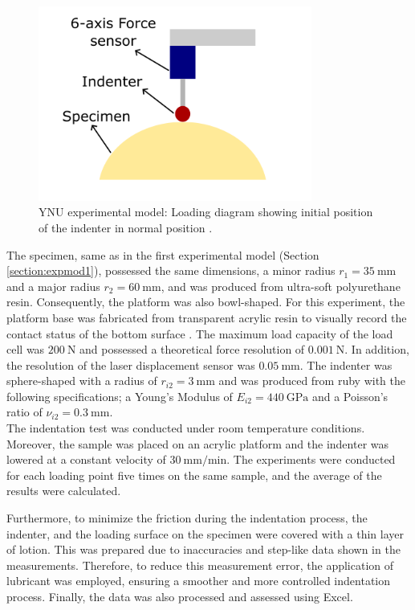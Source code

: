 \begin{figure}%
    \centering
   \quad
   \includegraphics[width=9cm]{Images/Experiment/Loadingdiagram.png}%
   \caption[Experimental model II diagram]{YNU experimental model: Loading diagram showing initial position of the indenter in normal position \cite{Mori2022}.}%
   \label{fig:loadingdiag}%
\end{figure}

The specimen, same as in the first experimental model (Section \ref{section:expmod1}),
possessed the same dimensions, a minor radius $r_1 = \SI{35}{\milli \m}$ and a major 
radius $r_2 = \SI{60}{\milli \m}$, and was
produced from ultra-soft polyurethane resin. Consequently, the platform was also 
bowl-shaped. For this experiment, the platform base was fabricated from transparent 
acrylic resin to visually record the contact status of the bottom surface \cite{Mori2022}. 
The maximum load capacity of the load cell was $\SI{200}{\newton}$ and possessed a theoretical 
force resolution of $\SI{0.001}{\newton}$. In addition, the resolution of the 
laser displacement sensor was $\SI{0.05}{\milli \m}$.
The indenter was sphere-shaped with a radius of $r_{i2} = \SI{3}{\milli \m}$ and
was produced from ruby with the following specifications; 
a Young's Modulus of $E_{i2} = \SI{440}{\giga \pascal}$ and a Poisson's ratio of 
$\nu_{i2} = \SI{0.3}{\milli \m}$.\\

The indentation test was conducted under room temperature conditions. Moreover, 
the sample was placed on an acrylic platform and the indenter was 
lowered at a constant velocity of $\SI[per-mode = symbol]{30}{\milli \m\per \minute}$. 
The experiments were conducted for each loading point five times on the same sample, 
and the average of the results were calculated.

Furthermore, to minimize the friction during the indentation process, the indenter, 
and the loading surface on the specimen were covered with a thin layer of lotion. 
This was prepared due to inaccuracies and step-like data shown in the measurements. Therefore, to reduce 
this measurement error, the application of lubricant was employed, ensuring a 
smoother and more controlled indentation process. Finally, the data 
was also processed and assessed using Excel.

